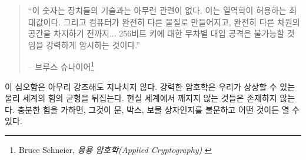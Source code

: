\begin{comment}
	\begin{quotation}\begin{samepage}
			\enquote{These numbers have nothing to do with the technology of the devices;
				they are the maximums that thermodynamics will allow. And they
				strongly imply that brute-force attacks against 256-bit keys will be
				infeasible until computers are built from something other than matter
				and occupy something other than space.}
			\begin{flushright} -- Bruce Schneier\footnote{Bruce Schneier, \textit{Applied Cryptography} \cite{bruce-schneier}}
	\end{flushright}\end{samepage}\end{quotation}
\end{comment}
\begin{quotation}\begin{samepage}
		\enquote{이 숫자는 장치들의 기술과는 아무런 관련이 없다. 
			이는 열역학이 허용하는 최대값이다.
			그리고 컴퓨터가 완전히 다른 물질로 만들어지고, 완전히 다른 차원의 공간을 차지하기 전까지...
			256비트 키에 대한 무차별 대입 공격은 불가능할 것임을 강력하게 암시하는 것이다.}
		\begin{flushright} -- 브루스 슈나이어\footnote{Bruce Schneier, \textit{응용 암호학(Applied Cryptography)} \cite{bruce-schneier}}
\end{flushright}\end{samepage}\end{quotation}

\begin{comment}
	It is hard to overstate the profoundness of this. Strong cryptography
	inverts the power-balance of the physical world we are so used to.
	Unbreakable things do not exist in the real world. Apply enough force,
	and you will be able to open any door, box, or treasure chest.
\end{comment}
이 심오함은 아무리 강조해도 지나치지 않다.  
강력한 암호학은 우리가 상상할 수 있는 물리 세계의 힘의 균형을 뒤집는다. 
현실 세계에서 깨지지 않는 것들은 존재하지 않는다. 
충분한 힘을 가하면, 그것이 문, 박스, 보물 상자인지를 불문하고 어떤 것이든 열 수 있다. 

